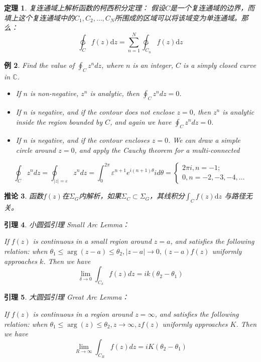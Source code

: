 \documentclass[10pt, a4paper, oneside]{ctexbook}
\newtheorem{theorem}{定理}[section]
\newtheorem{lemma}[theorem]{引理}
\newtheorem{corollary}[theorem]{推论}
\newtheorem{example}[theorem]{例}
\def\D{\mathrm{d}}
\newcommand{\F}[1][z]
{\ensuremath{f(#1)}}
\begin{document}
\begin{theorem}
    \label{cit2}
    复连通域上解析函数的柯西积分定理：
    假设$C$是一个复连通域的边界，而填上这个复连通域中的$C_1,C_2,\dots,C_N$所围成的区域可以将该域变为单连通域。那么：
    $$ \ointctrclockwise_C \F \D z= \sum_{n=1}^N \ointctrclockwise_{C_n} \F \D z$$
\end{theorem}
\begin{example}
Find the value of $\displaystyle \oint_{C} z^{n} d z$, where $n$ is an integer, $C$ is a simply closed curve in $\mathbb{C}$.
\begin{itemize} \rm
\item  If $n$ is non-negative, $z^{n}$ is analytic, then $\displaystyle \oint_{C} z^{n} d z=0$.
\item  If $n$ is negative, and if the contour does not enclose $z=0$, then $z^{n}$ is analytic inside the region bounded by $C$, and again we have $\displaystyle \oint_{C} z^{n} d z=0$.
\item  If $n$ is negative, and if the contour encloses $z=0$. We can draw a simple circle around $z=0$, and apply the Cauchy theorem for a multi-connected 
\end{itemize}
\begin{equation*}
\oint_{C} z^{n} d z=\oint_{|z|=\varepsilon} z^{n} d z=\int_{0}^{2 \pi} \varepsilon^{n+1} e^{i(n+1) \theta} i d \theta=\left\{\begin{array}{l}
2 \pi i, n=-1 ; \\
0, n=-2,-3,-4, \ldots
\end{array}\right.
\end{equation*}
\end{example}
\begin{corollary}
    函数$f(z)$在$\Sigma_G$内解析，如果$\Sigma_C\subset \Sigma_G$，其线积分$\displaystyle \int_C f(z)\D z$ 与路径无关。
\end{corollary}

\newpage

\begin{lemma}
    {\rm 小圆弧引理} Small Arc Lemma：

    {\rm If $f(z)$ is continuous in a small region around $z=a$, and satisfies the following relation: when $\theta_{1} \leq \arg (z-a) \leq \theta_{2},|z-a| \rightarrow 0,(z-a) f(z)$ uniformly approaches $k$. Then we have}
    $$\lim _{\delta \rightarrow 0} \int_{C_{\delta}} f(z) d z=i k\left(\theta_{2}-\theta_{1}\right)$$
\end{lemma}

\begin{lemma}
    {\rm 大圆弧引理} Great Arc Lemma：

    {\rm If $f(z)$ is continuous in a region around $z=\infty$, and satisfies the following relation: when $\theta_{1} \leq \arg (z) \leq \theta_{2}, z \rightarrow \infty, z f(z)$ uniformly approaches $K$. Then we have}
    \begin{equation*}
    \lim _{R \rightarrow \infty} \int_{C_{R}} f(z) d z=i K\left(\theta_{2}-\theta_{1}\right)
    \end{equation*}
\end{lemma}
\end{document}
